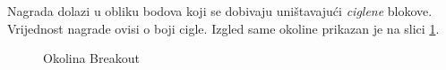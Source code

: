 Nagrada dolazi u obliku bodova koji se dobivaju uništavajući \textit{ciglene} blokove. Vrijednost nagrade ovisi o boji cigle. Izgled same okoline prikazan je na slici \ref{fig:breakout}.

\begin{figure}[H]
    \centering
    \caption{Okolina Breakout}
    \label{fig:breakout}
\end{figure}





